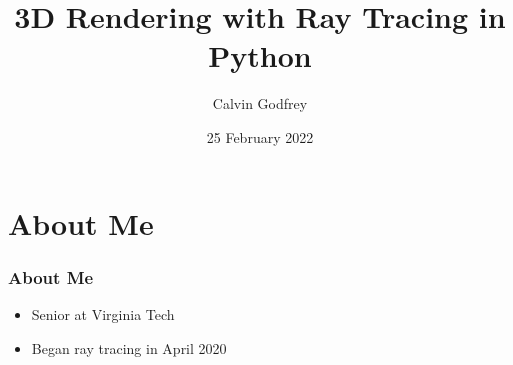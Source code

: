 \documentclass{beamer}
\title[Ray Tracing] %
{3D Rendering with Ray Tracing in Python}
\author{Calvin Godfrey}
\institute[] %
{Virginia Polytechnic Institute and State University}
\date[https://github.com/calvin-godfrey/RenderingWorkshop]{25 February 2022}
\begin{document}
\begin{frame}
	\titlepage
\end{frame}

\section{About Me}

\begin{frame}
	\frametitle{About Me}
	\begin{itemize}
		\item Senior at Virginia Tech
		\item Began ray tracing in April 2020
	\end{itemize}
\end{frame}
\end{document}
